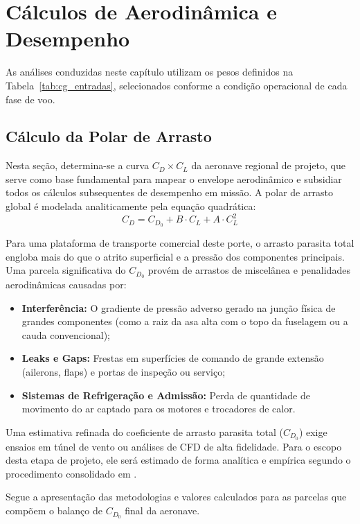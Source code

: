 \chapter{Cálculos de Aerodinâmica e Desempenho}

As análises conduzidas neste capítulo utilizam os pesos definidos na Tabela~\ref{tab:cg_entradas}, selecionados conforme a condição operacional de cada fase de voo.

\section{Cálculo da Polar de Arrasto}

Nesta seção, determina-se a curva $C_D \times C_L$ da aeronave regional de projeto, que serve como base fundamental para mapear o envelope aerodinâmico e subsidiar todos os cálculos subsequentes de desempenho em missão. A polar de arrasto global é modelada analiticamente pela equação quadrática:
\begin{equation}
    C_D = C_{D_0} + B \cdot C_L + A \cdot C_L^2
\end{equation}

Para uma plataforma de transporte comercial deste porte, o arrasto parasita total engloba mais do que o atrito superficial e a pressão dos componentes principais. Uma parcela significativa do $C_{D_0}$ provém de arrastos de miscelânea e penalidades aerodinâmicas causadas por:
\begin{itemize}
    \item \textbf{Interferência:} O gradiente de pressão adverso gerado na junção física de grandes componentes (como a raiz da asa alta com o topo da fuselagem ou a cauda convencional);
    \item \textbf{Leaks e Gaps:} Frestas em superfícies de comando de grande extensão (ailerons, flaps) e portas de inspeção ou serviço;
    \item \textbf{Sistemas de Refrigeração e Admissão:} Perda de quantidade de movimento do ar captado para os motores e trocadores de calor.
\end{itemize}

Uma estimativa refinada do coeficiente de arrasto parasita total ($C_{D_0}$) exige ensaios em túnel de vento ou análises de CFD de alta fidelidade. Para o escopo desta etapa de projeto, ele será estimado de forma analítica e empírica segundo o procedimento consolidado em \cite{Pullin}.

Segue a apresentação das metodologias e valores calculados para as parcelas que compõem o balanço de $C_{D_0}$ final da aeronave.

